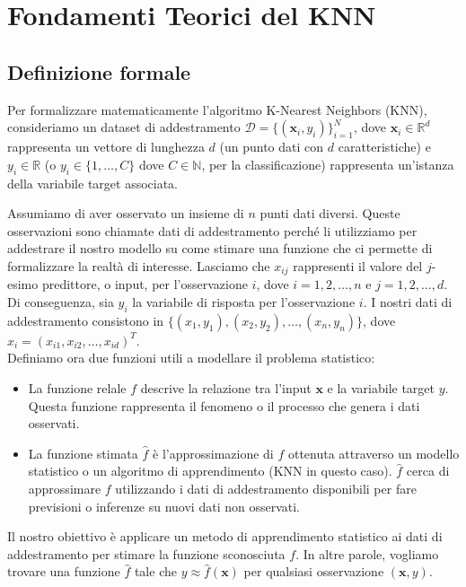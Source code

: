 \section{Fondamenti Teorici del KNN}

\subsection{Definizione formale}

Per formalizzare matematicamente l'algoritmo K-Nearest Neighbors (KNN), 
consideriamo un dataset di addestramento \( \mathcal{D} = \{(\mathbf{x}_i, y_i)\}_{i=1}^N \), 
dove \( \mathbf{x}_i \in \mathbb{R}^d \) rappresenta un vettore di lunghezza \( d \) 
(un punto dati con \( d \) caratteristiche) e \( y_i \in \mathbb{R} \) 
(o \( y_i \in \{1, \ldots, C\} \) dove \(C \in \mathbb{N}\), per la classificazione) rappresenta 
un'istanza della variabile target associata.

Assumiamo di aver osservato un insieme di \( n \) punti dati diversi. 
Queste osservazioni sono chiamate dati di addestramento perché li utilizziamo 
per addestrare il nostro modello su come stimare una funzione che ci permette di 
formalizzare la realtà di interesse. Lasciamo che \( x_{ij} \) 
rappresenti il valore del \( j \)-esimo predittore, o input, per l'osservazione \( i \), 
dove \( i = 1, 2, \ldots, n \) e \( j = 1, 2, \ldots, d \). Di conseguenza, sia \( y_i \) 
la variabile di risposta per l'osservazione \( i \). 
I nostri dati di addestramento consistono in \( \{(x_1, y_1), (x_2, y_2), 
\ldots, (x_n, y_n)\} \), dove \( x_i = (x_{i1}, x_{i2}, \ldots, x_{id})^T \).\\

Definiamo ora due funzioni utili a modellare il problema statistico:

\begin{itemize}
    \item La funzione relale \( f \) descrive la relazione tra l'input \( \mathbf{x} \) e la variabile target \( y \). Questa funzione rappresenta il fenomeno o il processo che genera i dati osservati.
    
    \item La funzione stimata \( \hat{f} \) è l'approssimazione di \( f \) 
    ottenuta attraverso un modello statistico o un algoritmo di apprendimento (KNN in questo caso). 
    \( \hat{f} \) cerca di approssimare \( f \) utilizzando i dati di addestramento disponibili per fare previsioni o inferenze su nuovi dati non osservati.
\end{itemize}
Il nostro obiettivo è applicare un metodo di apprendimento statistico 
ai dati di addestramento per stimare la funzione sconosciuta \( f \). 
In altre parole, vogliamo trovare una funzione \( \hat{f} \) tale che 
\( y \approx \hat{f}(\mathbf{x}) \) per qualsiasi osservazione \( (\mathbf{x}, y) \).

